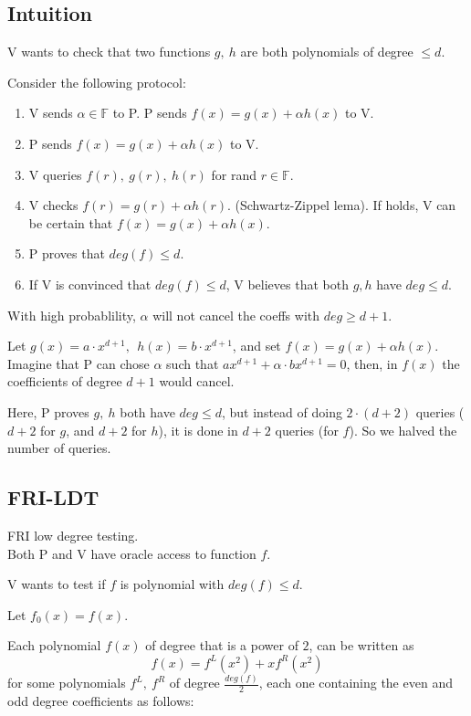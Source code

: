 \documentclass{article}
\theoremstyle{definition}
\begin{document}
\subsection{Intuition}
V wants to check that two functions $g,~h$ are both polynomials of degree $\leq d$.

Consider the following protocol:

\begin{enumerate}
	\item V sends $\alpha \in \mathbb{F}$ to P. P sends $f(x) = g(x) + \alpha h(x)$ to V.
	\item P sends $f(x)=g(x) + \alpha h(x)$ to V.
	\item V queries $f(r), ~g(r), ~h(r)$ for rand $r \in \mathbb{F}$.
	\item V checks $f(r)=g(r) + \alpha h(r)$. (Schwartz-Zippel lema).
		If holds, V can be certain that $f(x)=g(x)+ \alpha h(x)$.
	\item P proves that $deg(f) \leq d$. 
	\item If V is convinced that $deg(f) \leq d$, V believes that both $g, h$ have $deg \leq d$.
\end{enumerate}

With high probablility, $\alpha$ will not cancel the coeffs with $deg \geq d+1$. %

Let $g(x)=a \cdot x^{d+1}, ~~ h(x)=b \cdot x^{d+1}$, and set $f(x) = g(x) + \alpha h(x)$.
Imagine that P can chose $\alpha$ such that $a x^{d+1} + \alpha \cdot b x^{d+1} = 0$, then, in $f(x)$ the coefficients of degree $d+1$ would cancel.

\quad

Here, P proves $g,~h$ both have $deg \leq d$, but instead of doing $2 \cdot (d+2)$ queries ($d+2$ for $g$, and $d+2$ for $h$), it is done in $d+2$ queries (for $f$).
So we halved the number of queries.


\subsection{FRI-LDT}\label{sec:fri-ldt}
FRI low degree testing.\\
Both P and V have oracle access to function $f$.

V wants to test if $f$ is polynomial with $deg(f) \leq d$.

Let $f_0(x)=f(x)$.

Each polynomial $f(x)$ of degree that is a power of $2$, can be written as
$$f(x) = f^L(x^2) + x f^R(x^2)$$
for some polynomials $f^L,~f^R$ of degree $\frac{deg(f)}{2}$, each one containing the even and odd degree coefficients as follows:
\end{document}
